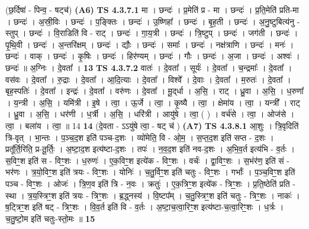 \documentclass[17pt]{extarticle}
\begin{document}
                  \newline
                      (छ॒र्दिषा॑ - पिन्व॒ - षट्च॑)  \textbf{(A6)} \newline \newline
                                \textbf{ TS 4.3.7.1} \newline
                  मा । छन्दः॑ । प्र॒मेति॑ प्र - मा । छन्दः॑ । प्र॒ति॒मेति॑ प्रति-मा । छन्दः॑ । अ॒स्री॒विः । छन्दः॑ । प॒ङ्क्तिः । छन्दः॑ । उ॒ष्णिहा᳚ । छन्दः॑ । बृ॒ह॒ती । छन्दः॑ । अ॒नु॒ष्टुबित्य॑नु - स्तुप् । छन्दः॑ । वि॒राडिति॑ वि - राट् । छन्दः॑ । गा॒य॒त्री । छन्दः॑ । त्रि॒ष्टुप् । छन्दः॑ । जग॑ती । छन्दः॑ । पृ॒थि॒वी । छन्दः॑ । अ॒न्तरि॑क्षम् । छन्दः॑ । द्यौः । छन्दः॑ । समाः᳚ । छन्दः॑ । नक्ष॑त्राणि । छन्दः॑ । मनः॑ । छन्दः॑ । वाक् । छन्दः॑ । कृ॒षिः । छन्दः॑ । हिर॑ण्यम् । छन्दः॑ । गौः । छन्दः॑ । अ॒जा । छन्दः॑ । अश्वः॑ । छन्दः॑ ॥ अ॒ग्निः । दे॒वता᳚ । \textbf{  13} \newline
                  \newline
                                \textbf{ TS 4.3.7.2} \newline
                  वातः॑ । दे॒वता᳚ । सूर्यः॑ । दे॒वता᳚ । च॒न्द्रमाः᳚ । दे॒वता᳚ । वस॑वः । दे॒वता᳚ । रु॒द्राः । दे॒वता᳚ । आ॒दि॒त्याः । दे॒वता᳚ । विश्वे᳚ । दे॒वाः । दे॒वता᳚ । म॒रुतः॑ । दे॒वता᳚ । बृह॒स्पतिः॑ । दे॒वता᳚ । इन्द्रः॑ । दे॒वता᳚ । वरु॑णः । दे॒वता᳚ । मू॒द्‌र्धा । अ॒सि॒ । राट् । ध्रु॒वा । अ॒सि॒ । ध॒रुणा᳚ । य॒न्त्री । अ॒सि॒ । यमि॑त्री । इ॒षे । त्वा॒ । ऊ॒र्जे । त्वा॒ । कृ॒ष्यै । त्वा॒ । क्षेमा॑य । त्वा॒ । यन्त्री᳚ । राट् । ध्रु॒वा । अ॒सि॒ । धर॑णी । ध॒र्त्री । अ॒सि॒ । धरि॑त्री । आयु॑षे । त्वा॒ ( ) । वर्च॑से । त्वा॒ । ओज॑से । त्वा॒ । बला॑य । त्वा॒ ॥ 14 \textbf{  14} \newline
                  \newline
                      (दे॒वता - ऽऽयु॑षे त्वा॒ - षट् च॑ )  \textbf{(A7)} \newline \newline
                                \textbf{ TS 4.3.8.1} \newline
                  आ॒शुः । त्रि॒वृदिति॑ त्रि-वृत् । भा॒न्तः । प॒ञ्च॒द॒श इति॑ पञ्च-द॒शः । व्यो॑मेति॒ वि - ओ॒म॒ । स॒प्त॒द॒श इति॑ सप्त - द॒शः । प्रतू᳚र्ति॒रिति॒ प्र-तू॒र्तिः॒ । अ॒ष्टा॒द॒श इत्य॑ष्टा-द॒शः । तपः॑ । न॒व॒द॒श इति॑ नव-द॒शः । अ॒भि॒व॒र्त इत्य॑भि - व॒र्तः । स॒विꣳ॒॒श इति॑ स - विꣳ॒॒शः । ध॒रुणः॑ । ए॒क॒विꣳ॒॒श इत्ये॑क - विꣳ॒॒शः । वर्चः॑ । द्वा॒विꣳ॒॒शः । स॒भंर॑ण॒ इति॑ सं - भर॑णः । त्र॒यो॒विꣳ॒॒श इति॑ त्रयः - विꣳ॒॒शः । योनिः॑ । च॒तु॒र्विꣳ॒॒श इति॑ चतुः - विꣳ॒॒शः । गर्भाः᳚ । प॒ञ्च॒विꣳ॒॒श इति॑ पञ्च - विꣳ॒॒शः । ओजः॑ । त्रि॒ण॒व इति॑ त्रि - न॒वः । क्रतुः॑ । ए॒क॒त्रिꣳ॒॒श इत्ये॑क - त्रिꣳ॒॒शः । प्र॒ति॒ष्ठेति॑ प्रति - स्था । त्र॒य॒स्त्रिꣳ॒॒श इति॑ त्रयः - त्रिꣳ॒॒शः । ब्र॒द्ध्नस्य॑ । वि॒ष्टप᳚म् । च॒तु॒स्त्रिꣳ॒॒श इति॑ चतुः - त्रिꣳ॒॒शः । नाकः॑ । ष॒ट्त्रिꣳ॒॒श इति॑ षट् - त्रिꣳ॒॒शः । वि॒व॒र्त इति॑ वि - व॒र्तः । अ॒ष्टा॒च॒त्वा॒रिꣳ॒॒श इत्य॑ष्टा-च॒त्वा॒रिꣳ॒॒शः । ध॒र्त्रः । च॒तु॒ष्टो॒म इति॑ चतुः-स्तो॒मः ॥ \textbf{  15} \newline
\end{document}
